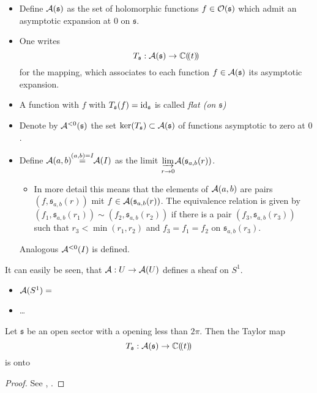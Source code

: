 \begin{notations}
  \begin{itemize}
    \item Define $\mathcal{A}(\mathfrak{s})$ as the set of holomorphic functions
      $f\in\mathcal{O}(\mathfrak{s})$ which admit an asymptotic expansion at $0$ on
      $\mathfrak{s}$.
    \item One writes
      \[
        T_{\mathfrak{s}}:\mathcal{A}(\mathfrak{s})\to\mathbb{C}(\!(t)\!)
      \]
      for the mapping, which associates to each function
      $f\in\mathcal{A}(\mathfrak{s})$ its asymptotic expansion.
    \item A function with $f$ with $T_{\mathfrak{s}}(f)=\operatorname{id}_{\mathfrak{s}}$ is
      called \emph{flat (on $\mathfrak{s}$)}
    \item Denote by $\mathcal{A}^{<0}(\mathfrak{s})$ the set
      $\ker(T_{\mathfrak{s}})\subset\mathcal{A}(\mathfrak{s})$ of functions asymptotic
      to zero at $0$.
    \item Define $\mathcal{A}(a,b)\!\!\overset{(a,b)=I}{=}\!\!\mathcal{A}(I)$
      as the limit
      $\underset{r\to0}{\underrightarrow{\lim}}\mathcal{A}(\mathfrak{s}_{a,b}(r))$.
      \begin{itemize}
        \item[] In more detail this means that the elements of $\mathcal{A}(a,b)$
          are pairs $(f,\mathfrak{s}_{a,b}(r))$ mit
          $f\in\mathcal{A}(\mathfrak{s}_{a,b}(r))$. The equivalence relation is given
          by $(f_1,\mathfrak{s}_{a,b}(r_1))\sim(f_2,\mathfrak{s}_{a,b}(r_2))$
          if there is a pair $(f_3,\mathfrak{s}_{a,b}(r_3))$ such that
          $r_3<\min(r_1,r_2)$ and $f_3=f_1=f_2$ on $\mathfrak{s}_{a,b}(r_3)$.
      \end{itemize}
      Analogous $\mathcal{A}^{<0}(I)$ is defined.
  \end{itemize}
\end{notations}
It can easily be seen, that $\mathcal{A}:U\to\mathcal{A}(U)$ defines a sheaf on $S^1$.
\begin{itemize}
  \item $\mathcal{A}(S^1)=$\TODO
  \item\dots
\end{itemize}

\begin{thm}
  Let $\mathfrak{s}$ be an open sector with a opening less than $2\pi$.
  Then the Taylor map
  \[
    T_{\mathfrak{s}}:\mathcal{A}(\mathfrak{s})\to\mathbb{C}(\!(t)\!)
  \]
  is onto
\end{thm}
\begin{proof}
  See \cite[theoreme 7.3]{van2003galois}, \cite{sabbah_cimpa90}.
\end{proof}

